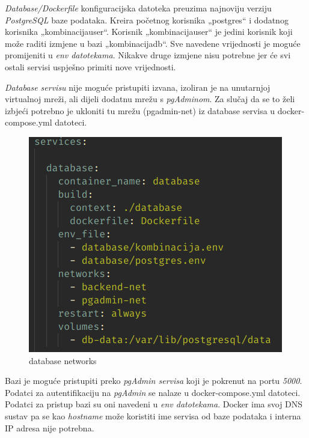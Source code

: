 				
				
		 \textit{Database/Dockerfile} konfiguracijska datoteka preuzima najnoviju verziju  \textit{PostgreSQL} baze podataka. Kreira početnog korisnika „postgres“ i dodatnog korisnika „kombinacijauser“. Korisnik „kombinacijauser“ je jedini korisnik koji može raditi izmjene u bazi „kombinacijadb“. Sve navedene vrijednosti je moguće promijeniti u  \textit{env datotekama}. Nikakve druge izmjene nisu potrebne jer će svi ostali servisi uspješno primiti nove vrijednosti.

		 \textit{Database servisu} nije moguće pristupiti izvana, izoliran je na unutarnjoj virtualnoj mreži, ali dijeli dodatnu mrežu s  \textit{pgAdminom}. Za slučaj da se to želi izbjeći potrebno je ukloniti tu mrežu (pgadmin-net) iz database servisa u docker-compose.yml datoteci.	
			
			
						
		\begin{figure}[H]
					\includegraphics[scale=0.9]{figures/initdb.PNG}
					\centering
					\caption{database networks}
					\label{fig:sekv-uc13}
				\end{figure}
						
			
			
				
		Bazi je moguće pristupiti preko  \textit{pgAdmin servisa} koji je pokrenut na portu  \textit{5000}. Podatci za autentifikaciju na  \textit{pgAdmin} se nalaze u docker-compose.yml datoteci. Podatci za pristup bazi su oni navedeni u  \textit{env datotekama}. Docker ima svoj DNS sustav pa se kao  \textit{hostname} može koristiti ime servisa od baze podataka i interna IP adresa nije potrebna.		
				
